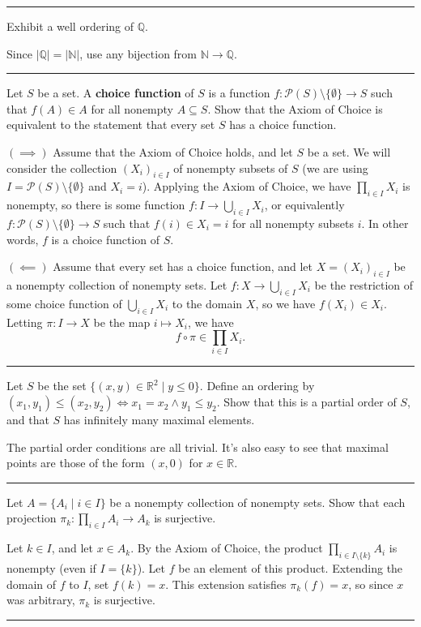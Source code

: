 \hrule
\begin{exercise}
    Exhibit a well ordering of $\mathbb{Q}$.
\end{exercise}
\begin{solution}
    Since $|\mathbb{Q}| = |\mathbb{N}|$, use any bijection from $\mathbb{N}\to\mathbb{Q}$.
\end{solution}

\hrule
\begin{exercise}
    Let $S$ be a set. A \textbf{choice function} of $S$ is a function $f:\mathcal{P}(S)\setminus\{\emptyset\} \to S$ such that $f(A)\in A$ for all nonempty $A\subseteq S$. Show that the Axiom of Choice is equivalent to the statement that every set $S$ has a choice function.
\end{exercise}
\begin{solution}
    $(\implies)$ Assume that the Axiom of Choice holds, and let $S$ be a set. We will consider the collection $(X_i)_{i\in I}$ of nonempty subsets of $S$ (we are using $I = \mathcal{P}(S)\setminus\{\emptyset\}$ and $X_i = i$). Applying the Axiom of Choice, we have $\prod_{i\in I} X_i$ is nonempty, so there is some function $f:I\to\bigcup_{i\in I} X_i$, or equivalently $f:\mathcal{P}(S)\setminus \{\emptyset\} \to S$ such that $f(i)\in X_i = i$ for all nonempty subsets $i$. In other words, $f$ is a choice function of $S$.

    $(\impliedby)$ Assume that every set has a choice function, and let $X = (X_i)_{i\in I}$ be a nonempty collection of nonempty sets. Let $f:X\to\bigcup_{i\in I} X_i$ be the restriction of some choice function of $\bigcup_{i\in I} X_i$ to the domain $X$, so we have $f(X_i) \in X_i$. Letting $\pi:I\to X$ be the map $i\mapsto X_i$, we have
    $$f\circ \pi \in \prod_{i\in I}X_i.$$
\end{solution}
\hrule

\begin{exercise}
    Let $S$ be the set $\{(x,y)\in \mathbb{R}^2 \mid y\le 0\}$. Define an ordering by $(x_1,y_1) \le (x_2,y_2) \iff x_1 = x_2 \land y_1 \le y_2$. Show that this is a partial order of $S$, and that $S$ has infinitely many maximal elements.
\end{exercise}
\begin{solution}
    The partial order conditions are all trivial. It's also easy to see that maximal points are those of the form $(x,0)$ for $x\in \mathbb{R}$.
\end{solution}
\hrule

\begin{exercise}
    Let $A = \{A_i\mid i\in I\}$ be a nonempty collection of nonempty sets. Show that each projection $\pi_k:\prod_{i\in I} A_i \to A_k$ is surjective.
\end{exercise}
\begin{solution}
    Let $k\in I$, and let $x\in A_k$. By the Axiom of Choice, the product $\displaystyle\prod_{i\in I\setminus\{k\}} A_i$ is nonempty (even if $I = \{k\}$). Let $f$ be an element of this product. Extending the domain of $f$ to $I$, set $f(k) = x$. This extension satisfies $\pi_k(f) = x$, so since $x$ was arbitrary, $\pi_k$ is surjective.
\end{solution}
\hrule

